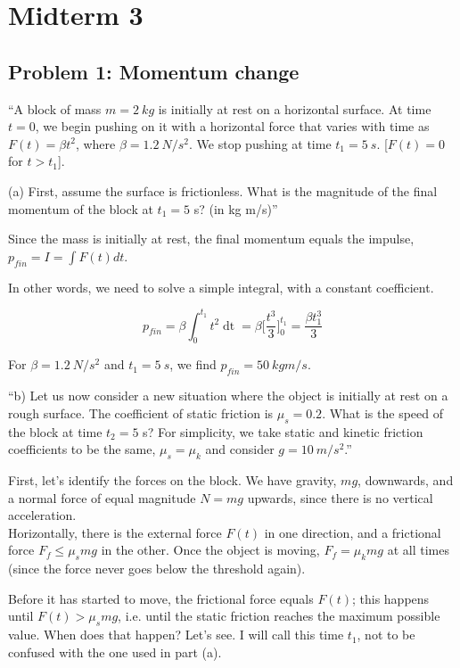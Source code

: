 \documentclass[8.01x]{subfiles}
\begin{document}
\chapter{Midterm 3}

\section{Problem 1: Momentum change}

``A block of mass $m = \SI{2}{kg}$ is initially at rest on a horizontal surface. At time $t = 0$, we begin pushing on it with a horizontal force that varies with time as $F(t)=\beta t^2$, where $\beta = \SI{1.2}{N/s^2}$. We stop pushing at time $t_1 = \SI{5}{s}$. [$F(t) = 0$ for $t>t_1$].

(a) First, assume the surface is frictionless. What is the magnitude of the final momentum of the block at $t_1 = 5$ s? (in kg m/s)''

Since the mass is initially at rest, the final momentum equals the impulse, $\displaystyle p_{fin} = I = \int F(t) dt$.

In other words, we need to solve a simple integral, with a constant coefficient.

\begin{equation}
p_{fin} = \beta \int_0^{t_1} t^2 \mathop{dt} = \beta \Big[ \frac{t^3}{3} \Big]_0^{t_1} = \frac{\beta t_1^3}{3} 
\end{equation}

For $\beta = \SI{1.2}{N/s^2}$ and $t_1 = \SI{5}{s}$, we find $p_{fin} = \SI{50}{kg m/s}$.

``b) Let us now consider a new situation where the object is initially at rest on a rough surface. The coefficient of static friction is $\mu_s = 0.2$. What is the speed of the block at time $t_2 = 5$ s? For simplicity, we take static and kinetic friction coefficients to be the same, $\mu_s = \mu_k$ and consider $g = \SI{10}{m/s^2}$.''

First, let's identify the forces on the block. We have gravity, $m g$, downwards, and a normal force of equal magnitude $N = m g$ upwards, since there is no vertical acceleration.\\
Horizontally, there is the external force $F(t)$ in one direction, and a frictional force $F_f \le \mu_s m g$ in the other. Once the object is moving, $F_f = \mu_k m g$ at all times (since the force never goes below the threshold again).

Before it has started to move, the frictional force equals $F(t)$; this happens until $F(t) > \mu_s m g$, i.e. until the static friction reaches the maximum possible value. When does that happen? Let's see. I will call this time $t_1$, not to be confused with the one used in part (a).
\end{document}
